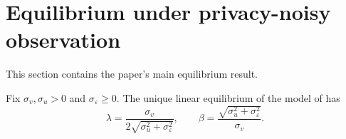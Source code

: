 \documentclass[runningheads]{llncs}
\newcommand{\sigv}{\sigma_v}
\newcommand{\sigu}{\sigma_u}
\newcommand{\sige}{\sigma_\varepsilon}
\begin{document}
\section{Equilibrium under privacy-noisy observation}
\label{sec:equilibrium}

This section contains the paper's main equilibrium result.

\begin{theorem}
\label{thm:equilibrium}
Fix $\sigv, \sigu > 0$ and $\sige \geq 0$. The unique linear
equilibrium of the model of  has
\begin{equation}
\lambda = \frac{\sigv}{2\sqrt{\sigu^2 + \sige^2}},
\qquad
\beta = \frac{\sqrt{\sigu^2 + \sige^2}}{\sigv}.
\label{eq:equilibrium}
\end{equation}
\end{theorem}
\end{document}
